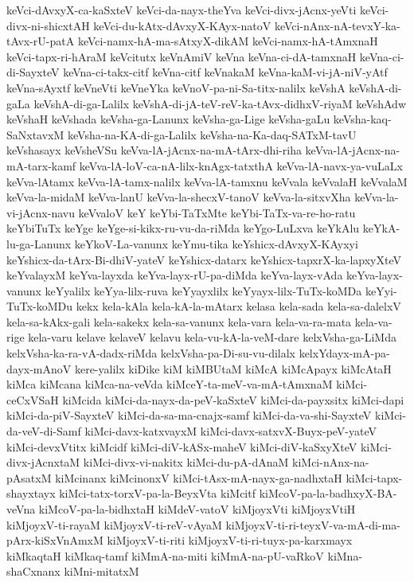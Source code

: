 {keVci-dAvxyX-ca-kaSxteV
keVci-da-nayx-theYva
keVci-divx-jAcnx-yeVti
keVci-divx-ni-shicxtAH
keVci-du-kAtx-dAvxyX-KAyx-natoV
keVci-nAnx-nA-tevxY-ka-tAvx-rU-patA
keVci-namx-hA-ma-sAtxyX-dikAM
keVci-namx-hA-tAmxnaH
keVci-tapx-ri-hAraM
keVcitutx
keVnAmiV
keVna
keVna-ci-dA-tamxnaH
keVna-ci-di-SayxteV
keVna-ci-takx-citf
keVna-citf
keVnakaM
keVna-kaM-vi-jA-niV-yAtf
keVna-sAyxtf
keVneVti
keVneYka
keVnoV-pa-ni-Sa-titx-nalilx
keVshA
keVshA-di-gaLa
keVshA-di-ga-Lalilx
keVshA-di-jA-teV-reV-ka-tAvx-didhxV-riyaM
keVshAdw
keVshaH
keVshada
keVsha-ga-Lanunx
keVsha-ga-Lige
keVsha-gaLu
keVsha-kaq-SaNxtavxM
keVsha-na-KA-di-ga-Lalilx
keVsha-na-Ka-daq-SATxM-tavU
keVshasayx
keVsheVSu
keVva-lA-jAcnx-na-mA-tArx-dhi-riha
keVva-lA-jAcnx-na-mA-tarx-kamf
keVva-lA-loV-ca-nA-lilx-knAgx-tatxthA
keVva-lA-navx-ya-vuLaLx
keVva-lAtamx
keVva-lA-tamx-nalilx
keVva-lA-tamxnu
keVvala
keVvalaH
keVvalaM
keVva-la-midaM
keVva-lanU
keVva-la-shecxV-tanoV
keVva-la-sitxvXha
keVva-la-vi-jAcnx-navu
keVvaloV
keY
keYbi-TaTxMte
keYbi-TaTx-va-re-ho-ratu
keYbiTuTx
keYge
keYge-si-kikx-ru-vu-da-riMda
keYgo-LuLxva
keYkAlu
keYkA-lu-ga-Lanunx
keYkoV-La-vanunx
keYmu-tika
keYshicx-dAvxyX-KAyxyi
keYshicx-da-tArx-Bi-dhiV-yateV
keYshicx-datarx
keYshicx-tapxrX-ka-lapxyXteV
keYvalayxM
keYva-layxda
keYva-layx-rU-pa-diMda
keYva-layx-vAda
keYva-layx-vanunx
keYyalilx
keYya-lilx-ruva
keYyayxlilx
keYyayx-lilx-TuTx-koMDa
keYyi-TuTx-koMDu
kekx
kela-kAla
kela-kA-la-mAtarx
kelasa
kela-sada
kela-sa-dalelxV
kela-sa-kAkx-gali
kela-sakekx
kela-sa-vanunx
kela-vara
kela-va-ra-mata
kela-va-rige
kela-varu
kelave
kelaveV
kelavu
kela-vu-kA-la-veM-dare
kelxVsha-ga-LiMda
kelxVsha-ka-ra-vA-dadx-riMda
kelxVsha-pa-Di-su-vu-dilalx
kelxYdayx-mA-pa-dayx-mAnoV
kere-yalilx
kiDike
kiM
kiMBUtaM
kiMcA
kiMcApayx
kiMcAtaH
kiMca
kiMcana
kiMca-na-veVda
kiMceY-ta-meV-va-mA-tAmxnaM
kiMci-ceCxVSaH
kiMcida
kiMci-da-nayx-da-peV-kaSxteV
kiMci-da-payxsitx
kiMci-dapi
kiMci-da-piV-SayxteV
kiMci-da-sa-ma-cnajx-samf
kiMci-da-va-shi-SayxteV
kiMci-da-veV-di-Samf
kiMci-davx-katxvayxM
kiMci-davx-satxvX-Buyx-peV-yateV
kiMci-devxVtitx
kiMcidf
kiMci-diV-kASx-maheV
kiMci-diV-kaSxyXteV
kiMci-divx-jAcnxtaM
kiMci-divx-vi-nakitx
kiMci-du-pA-dAnaM
kiMci-nAnx-na-pAsatxM
kiMcinanx
kiMcinonxV
kiMci-tAsx-mA-nayx-ga-nadhxtaH
kiMci-tapx-shayxtayx
kiMci-tatx-torxV-pa-la-BeyxVta
kiMcitf
kiMcoV-pa-la-badhxyX-BA-veVna
kiMcoV-pa-la-bidhxtaH
kiMdeV-vatoV
kiMjoyxVti
kiMjoyxVtiH
kiMjoyxV-ti-rayaM
kiMjoyxV-ti-reV-vAyaM
kiMjoyxV-ti-ri-teyxV-va-mA-di-ma-pArx-kiSxVnAmxM
kiMjoyxV-ti-riti
kiMjoyxV-ti-ri-tuyx-pa-karxmayx
kiMkaqtaH
kiMkaq-tamf
kiMmA-na-miti
kiMmA-na-pU-vaRkoV
kiMna-shaCxnanx
kiMni-mitatxM
}
